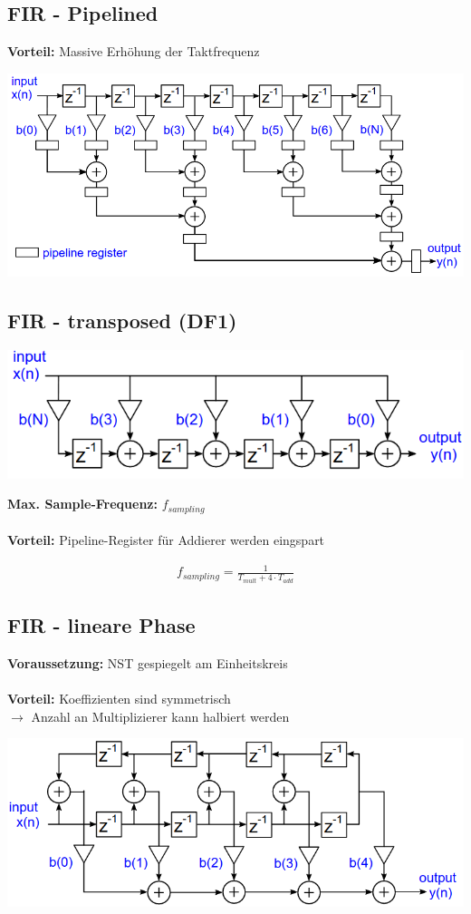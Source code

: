 \documentclass[10pt,a4paper]{article}
\begin{document}
\subsection{FIR - Pipelined} 
\textbf{Vorteil: } Massive Erhöhung der Taktfrequenz
  \begin{center}
      \includegraphics[width=.35\textwidth]{./img/firpipeline.png}
  \end{center}
\subsection{FIR - transposed (DF1)}

  \begin{center}
      \includegraphics[width=.35\textwidth]{./img/firtransposed.png}
  \end{center}
\textbf{Max. Sample-Frequenz:} $f_{sampling}$\\
\\\textbf{Vorteil: } Pipeline-Register für Addierer werden eingspart
  \begin{mdframed}[style=exercise]
    \begin{align}
        f_{sampling}=\frac{1}{T_{mult}+4\cdot T_{add}}
    \end{align}
  \end{mdframed}

\subsection{FIR - lineare Phase}
\textbf{Voraussetzung: } NST \grqq{}gespiegelt\grqq{} am Einheitskreis\\
\\\textbf{Vorteil: } Koeffizienten sind symmetrisch\\ $\rightarrow$ Anzahl an Multiplizierer kann halbiert werden

  \begin{center}
      \includegraphics[width=.35\textwidth]{./img/firlinear.png}
  \end{center}
\end{document}
